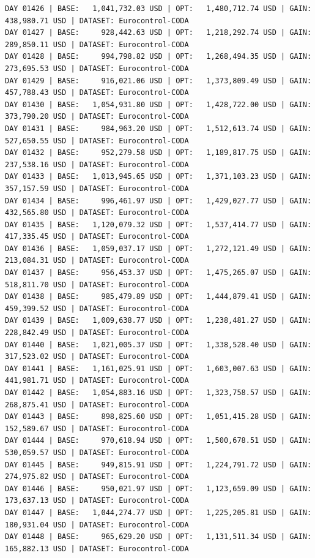 \documentclass[11pt,a4paper]{article}
\begin{document}
\begin{verbatim}
DAY 01426 | BASE:   1,041,732.03 USD | OPT:   1,480,712.74 USD | GAIN: 438,980.71 USD | DATASET: Eurocontrol-CODA
DAY 01427 | BASE:     928,442.63 USD | OPT:   1,218,292.74 USD | GAIN: 289,850.11 USD | DATASET: Eurocontrol-CODA
DAY 01428 | BASE:     994,798.82 USD | OPT:   1,268,494.35 USD | GAIN: 273,695.53 USD | DATASET: Eurocontrol-CODA
DAY 01429 | BASE:     916,021.06 USD | OPT:   1,373,809.49 USD | GAIN: 457,788.43 USD | DATASET: Eurocontrol-CODA
DAY 01430 | BASE:   1,054,931.80 USD | OPT:   1,428,722.00 USD | GAIN: 373,790.20 USD | DATASET: Eurocontrol-CODA
DAY 01431 | BASE:     984,963.20 USD | OPT:   1,512,613.74 USD | GAIN: 527,650.55 USD | DATASET: Eurocontrol-CODA
DAY 01432 | BASE:     952,279.58 USD | OPT:   1,189,817.75 USD | GAIN: 237,538.16 USD | DATASET: Eurocontrol-CODA
DAY 01433 | BASE:   1,013,945.65 USD | OPT:   1,371,103.23 USD | GAIN: 357,157.59 USD | DATASET: Eurocontrol-CODA
DAY 01434 | BASE:     996,461.97 USD | OPT:   1,429,027.77 USD | GAIN: 432,565.80 USD | DATASET: Eurocontrol-CODA
DAY 01435 | BASE:   1,120,079.32 USD | OPT:   1,537,414.77 USD | GAIN: 417,335.45 USD | DATASET: Eurocontrol-CODA
DAY 01436 | BASE:   1,059,037.17 USD | OPT:   1,272,121.49 USD | GAIN: 213,084.31 USD | DATASET: Eurocontrol-CODA
DAY 01437 | BASE:     956,453.37 USD | OPT:   1,475,265.07 USD | GAIN: 518,811.70 USD | DATASET: Eurocontrol-CODA
DAY 01438 | BASE:     985,479.89 USD | OPT:   1,444,879.41 USD | GAIN: 459,399.52 USD | DATASET: Eurocontrol-CODA
DAY 01439 | BASE:   1,009,638.77 USD | OPT:   1,238,481.27 USD | GAIN: 228,842.49 USD | DATASET: Eurocontrol-CODA
DAY 01440 | BASE:   1,021,005.37 USD | OPT:   1,338,528.40 USD | GAIN: 317,523.02 USD | DATASET: Eurocontrol-CODA
DAY 01441 | BASE:   1,161,025.91 USD | OPT:   1,603,007.63 USD | GAIN: 441,981.71 USD | DATASET: Eurocontrol-CODA
DAY 01442 | BASE:   1,054,883.16 USD | OPT:   1,323,758.57 USD | GAIN: 268,875.41 USD | DATASET: Eurocontrol-CODA
DAY 01443 | BASE:     898,825.60 USD | OPT:   1,051,415.28 USD | GAIN: 152,589.67 USD | DATASET: Eurocontrol-CODA
DAY 01444 | BASE:     970,618.94 USD | OPT:   1,500,678.51 USD | GAIN: 530,059.57 USD | DATASET: Eurocontrol-CODA
DAY 01445 | BASE:     949,815.91 USD | OPT:   1,224,791.72 USD | GAIN: 274,975.82 USD | DATASET: Eurocontrol-CODA
DAY 01446 | BASE:     950,021.97 USD | OPT:   1,123,659.09 USD | GAIN: 173,637.13 USD | DATASET: Eurocontrol-CODA
DAY 01447 | BASE:   1,044,274.77 USD | OPT:   1,225,205.81 USD | GAIN: 180,931.04 USD | DATASET: Eurocontrol-CODA
DAY 01448 | BASE:     965,629.20 USD | OPT:   1,131,511.34 USD | GAIN: 165,882.13 USD | DATASET: Eurocontrol-CODA

\end{verbatim}
\end{document}
